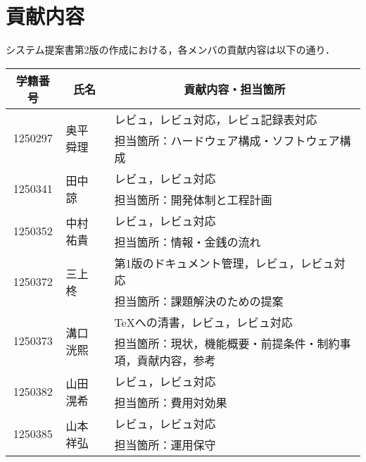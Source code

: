 \chapter{貢献内容}
システム提案書第2版の作成における，各メンバの貢献内容は以下の通り．
\begin{table}[h]
    \centering
    \begin{tabularx}{\textwidth}{cll}
        \multicolumn{1}{c}{学籍番号} & \multicolumn{1}{c}{氏名} & \multicolumn{1}{c}{貢献内容・担当箇所}  \\
        \hline
        \multirow{2}{*}{1250297} & \multirow{2}{*}{奥平 舜理} & レビュ，レビュ対応，レビュ記録表対応             \\
                                 &                        & 担当箇所：ハードウェア構成・ソフトウェア構成         \\
        \hline
        \multirow{2}{*}{1250341} & \multirow{2}{*}{田中 諒}  & レビュ，レビュ対応                      \\
                                 &                        & 担当箇所：開発体制と工程計画                 \\
        \hline
        \multirow{2}{*}{1250352} & \multirow{2}{*}{中村 祐貴} & レビュ，レビュ対応                      \\
                                 &                        & 担当箇所：情報・金銭の流れ                  \\
        \hline
        \multirow{2}{*}{1250372} & \multirow{2}{*}{三上 柊}  & 第1版のドキュメント管理，レビュ，レビュ対応         \\
                                 &                        & 担当箇所：課題解決のための提案                \\
        \hline
        \multirow{2}{*}{1250373} & \multirow{2}{*}{溝口 洸熙} & \TeX への清書，レビュ，レビュ対応            \\
                                 &                        & 担当箇所：現状，機能概要・前提条件・制約事項，貢献内容，参考 \\
        \hline
        \multirow{2}{*}{1250382} & \multirow{2}{*}{山田 滉希} & レビュ，レビュ対応                      \\
                                 &                        & 担当箇所：費用対効果                     \\
        \hline
        \multirow{2}{*}{1250385} & \multirow{2}{*}{山本 祥弘} & レビュ，レビュ対応                      \\
                                 &                        & 担当箇所：運用保守                      \\
        \hline
    \end{tabularx}
\end{table}